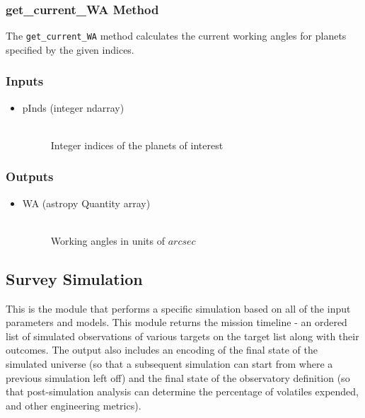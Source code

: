 \documentclass[cleanfoot]{asme2ej}
\begin{document}
\subsubsection{get\_current\_WA Method} \label{sec:getcurrentWAtask}
The \verb+get_current_WA+ method calculates the current working angles for planets specified by the given indices.

\subsubsection*{Inputs}
\begin{itemize}
    \item 
    \begin{description}
        \item[pInds (integer ndarray)] \hfill \\
        Integer indices of the planets of interest
    \end{description}
\end{itemize}
\subsubsection*{Outputs}
\begin{itemize}
    \item 
    \begin{description}
        \item[WA (astropy Quantity array)] \hfill \\
        Working angles in units of $ arcsec $
    \end{description}
\end{itemize}


\subsection{Survey Simulation} \label{sec:surveysim}
This is the module that performs a specific simulation based on all of the input parameters and models. This module returns the mission timeline - an ordered list of simulated observations of various targets on the target list along with their outcomes.  The output also includes an encoding of the final state of the simulated universe (so that a subsequent simulation can start from where a previous simulation left off) and the final state of the observatory definition (so that post-simulation analysis can determine the percentage of volatiles expended, and other engineering metrics).
\end{document}
